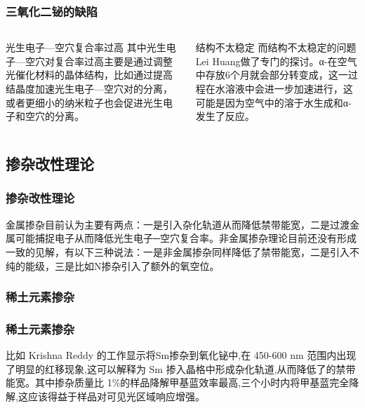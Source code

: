 \documentclass[xetex,compress]{mybeamer}
\begin{document}
\begin{frame}
\frametitle{三氧化二铋的缺陷}
\begin{columns}
\begin{block}{光生电子—空穴复合率过高}
其中光生电子—空穴对复合率过高主要是通过调整光催化材料的晶体结构，比如通过提高结晶度加速光生电子—空穴对的分离，或者更细小的纳米粒子也会促进光生电子和空穴的分离。
\end{block}
\begin{block}{结构不太稳定}
而结构不太稳定的问题Lei Huang做了专门的探讨。α-在空气中存放6个月就会部分转变成，这一过程在水溶液中会进一步加速进行，这可能是因为空气中的溶于水生成和α-发生了反应。
\end{block}
\end{columns}
\end{frame}


\subsection{掺杂改性理论}
\begin{frame}
\frametitle{掺杂改性理论}
\begin{block}{}
金属掺杂目前认为主要有两点：一是引入杂化轨道从而降低禁带能宽，二是过渡金属可能捕捉电子从而降低光生电子─空穴复合率。非金属掺杂理论目前还没有形成一致的见解，有以下三种说法：一是非金属掺杂同样降低了禁带能宽，二是引入不纯的能级，三是比如N掺杂引入了额外的氧空位。
\end{block}
\end{frame}

\subsubsection{稀土元素掺杂}
\begin{frame}
\frametitle{稀土元素掺杂}
\begin{block}{}
比如 Krishna Reddy 的工作显示将Sm掺杂到氧化铋中,在 450-600 nm 范围内出现了明显的红移现象,这可以解释为 Sm 掺入晶格中形成杂化轨道,从而降低了的禁带能宽。其中掺杂质量比 1\%的样品降解甲基蓝效率最高,三个小时内将甲基蓝完全降解,这应该得益于样品对可见光区域响应增强。
\end{block}
\end{frame}
\end{document}
